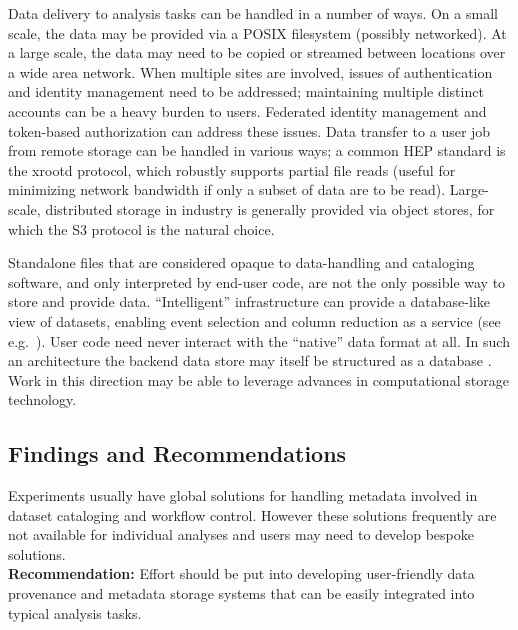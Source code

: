 Data delivery to analysis tasks can be handled in a number of ways. On a small scale, the data may be provided via a POSIX filesystem (possibly networked). At a large scale, the data may need to be copied or streamed between locations over a wide area network. When multiple sites are involved, issues of authentication and identity management need to be addressed; maintaining multiple distinct accounts can be a heavy burden to users. Federated identity management and token-based authorization can address these issues.  Data transfer to a user job from remote storage can be handled in various ways; a common HEP standard is the xrootd protocol, which robustly supports partial file reads (useful for minimizing network bandwidth if only a subset of data are to be read). Large-scale, distributed storage in industry is generally provided via object stores, for which the S3 protocol is the natural choice.

Standalone files that are considered opaque to data-handling and cataloging software, and only interpreted by end-user code, are not the only possible way to store and provide data. ``Intelligent'' infrastructure can provide a database-like view of datasets, enabling event selection and column reduction as a service (see e.g.\ \cite{Galewsky:2020xig}). User code need never interact with the ``native'' data format at all. In such an architecture the backend data store may itself be structured as a database \cite{Gutsche:2020kmd}. Work in this direction may be able to leverage advances in computational storage technology.

\subsection{Findings and Recommendations}
Experiments usually have global solutions for handling metadata involved in dataset cataloging and workflow control. However these solutions frequently are not available for individual analyses and users may need to develop bespoke solutions.\\
\textbf{Recommendation:} Effort should be put into developing user-friendly data provenance and metadata storage systems that can be easily integrated into typical analysis tasks.

